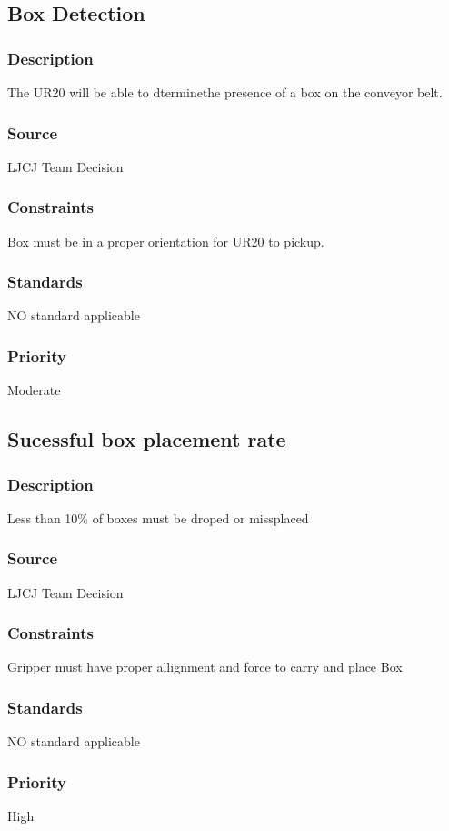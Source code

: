 \subsection{Box Detection}
\subsubsection{Description}
The UR20 will be able to dterminethe presence of a box on the conveyor belt.
\subsubsection{Source}
LJCJ Team Decision
\subsubsection{Constraints}
Box must be in a proper orientation for UR20 to pickup.
\subsubsection{Standards}
NO standard applicable
\subsubsection{Priority}
Moderate

\subsection{Sucessful box placement rate}
\subsubsection{Description}
 Less than 10\% of boxes must be droped or missplaced
\subsubsection{Source}
LJCJ Team Decision
\subsubsection{Constraints}
Gripper must have proper allignment and force to carry and place Box
\subsubsection{Standards}
NO standard applicable
\subsubsection{Priority}
High
